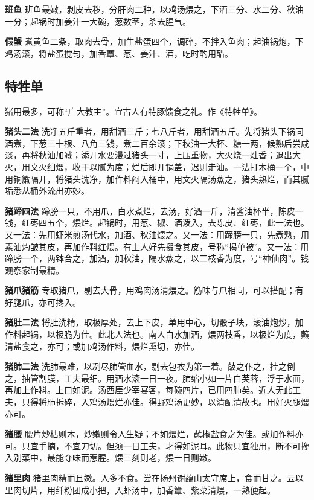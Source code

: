 \documentclass[]{article}
\begin{document}
\textbf{班鱼}
班鱼最嫩，剥皮去秽，分肝肉二种，以鸡汤煨之，下酒三分、水二分、秋油一分；起锅时加姜汁一大碗，葱数茎，杀去腥气。

\textbf{假蟹}
煮黄鱼二条，取肉去骨，加生盐蛋四个，调碎，不拌入鱼肉；起油锅炮，下鸡汤滚，将盐蛋搅匀，加香蕈、葱、姜汁、酒，吃时酌用醋。

\hypertarget{header-n17}{%
\subsection{特牲单}\label{header-n17}}

猪用最多，可称``广大教主''。宜古人有特豚馈食之礼。作《特牲单》。

\textbf{猪头二法}
洗净五斤重者，用甜酒三斤；七八斤者，用甜酒五斤。先将猪头下锅同酒煮，下葱三十根、八角三钱，煮二百余滚；下秋油一大杯、糖一两，候熟后尝咸淡，再将秋油加减；添开水要漫过猪头一寸，上压重物，大火烧一炷香；退出大火，用文火细煨，收干以腻为度；烂后即开锅盖，迟则走油。一法打木桶一个，中用铜簾隔开，将猪头洗净，加作料闷入桶中，用文火隔汤蒸之，猪头熟烂，而其腻垢悉从桶外流出亦妙。

\textbf{猪蹄四法}
蹄膀一只，不用爪，白水煮烂，去汤，好酒一斤，清酱油杯半，陈皮一钱，红枣四五个，煨烂。起锅时，用葱、椒、酒泼入，去陈皮、红枣，此一法也。又一法：先用虾米煎汤代水，加酒、秋油煨之。又一法：用蹄膀一只，先煮熟，用素油灼皱其皮，再加作料红煨。有土人好先掇食其皮，号称``揭单被''。又一法：用蹄膀一个，两钵合之，加酒，加秋油，隔水蒸之，以二枝香为度，号``神仙肉''。钱观察家制最精。

\textbf{猪爪猪筋}
专取猪爪，剔去大骨，用鸡肉汤清煨之。筋味与爪相同，可以搭配；有好腿爪，亦可搀入。

\textbf{猪肚二法}
将肚洗精，取极厚处，去上下皮，单用中心，切骰子块，滚油炮炒，加作料起锅，以极脆为佳。此北人法也。南人白水加酒，煨两枝香，以极烂为度，蘸清盐食之，亦可；或加鸡汤作料，煨烂熏切，亦佳。

\textbf{猪肺二法}
洗肺最难，以冽尽肺管血水，剔去包衣为第一着。敲之仆之，挂之倒之，抽管割膜，工夫最细。用酒水滚一日一夜。肺缩小如一片白芙蓉，浮于水面，再加上作料。上口如泥。汤西厓少宰宴客，每碗四片，已用四肺矣。近人无此工夫，只得将肺拆碎，入鸡汤煨烂亦佳。得野鸡汤更妙，以清配清故也。用好火腿煨亦可。

\textbf{猪腰}
腰片炒枯则木，炒嫩则令人生疑；不如煨烂，蘸椒盐食之为佳。或加作料亦可。只宜手摘，不宜刀切。但须一日工夫，才得如泥耳。此物只宜独用，断不可搀入别菜中，最能夺味而惹腥。煨三刻则老，煨一日则嫩。

\textbf{猪里肉}
猪里肉精而且嫩。人多不食。尝在扬州谢蕴山太守席上，食而甘之。云以里肉切片，用纤粉团成小把，入虾汤中，加香簟、紫菜清煨，一熟便起。
\end{document}

